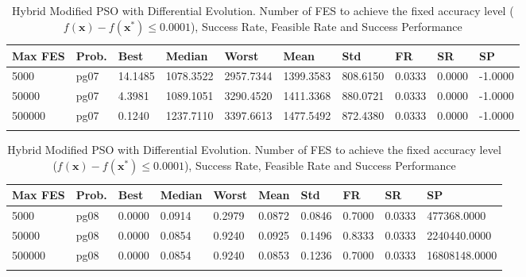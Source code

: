\documentclass[10pt, a4paper]{book}
\begin{document}
\begin{center}
\begin{longtable}{l l l l l l l l l l}
\textbf{Max FES} & \textbf{Prob.} & \textbf{Best} & \textbf{Median} & \textbf{Worst} & \textbf{Mean} & \textbf{Std} & \textbf{FR} & \textbf{SR} & \textbf{SP} \\
\hline
5000 & pg07 & 14.1485 & 1078.3522 & 2957.7344 & 1399.3583 & 808.6150 & 0.0333 & 0.0000 & -1.0000 \\
50000 & pg07 & 4.3981 & 1089.1051 & 3290.4520 & 1411.3368 & 880.0721 & 0.0333 & 0.0000 & -1.0000 \\
500000 & pg07 & 0.1240 & 1237.7110 & 3397.6613 & 1477.5492 & 872.4380 & 0.0333 & 0.0000 & -1.0000 \\

\caption{ Hybrid Modified PSO with Differential Evolution. Number of FES to achieve the fixed accuracy level ($f(\mathbf{x}) - f(\mathbf{x}^{*}) \leq 0.0001$), Success Rate, Feasible Rate and Success Performance }
\end{longtable}
\end{center}

\begin{center}
\begin{longtable}{l l l l l l l l l l}
\textbf{Max FES} & \textbf{Prob.} & \textbf{Best} & \textbf{Median} & \textbf{Worst} & \textbf{Mean} & \textbf{Std} & \textbf{FR} & \textbf{SR} & \textbf{SP} \\
\hline
5000 & pg08 & 0.0000 & 0.0914 & 0.2979 & 0.0872 & 0.0846 & 0.7000 & 0.0333 & 477368.0000 \\
50000 & pg08 & 0.0000 & 0.0854 & 0.9240 & 0.0925 & 0.1496 & 0.8333 & 0.0333 & 2240440.0000 \\
500000 & pg08 & 0.0000 & 0.0854 & 0.9240 & 0.0853 & 0.1236 & 0.7000 & 0.0333 & 16808148.0000 \\

\caption{ Hybrid Modified PSO with Differential Evolution. Number of FES to achieve the fixed accuracy level ($f(\mathbf{x}) - f(\mathbf{x}^{*}) \leq 0.0001$), Success Rate, Feasible Rate and Success Performance }
\end{longtable}
\end{center}
\end{document}
